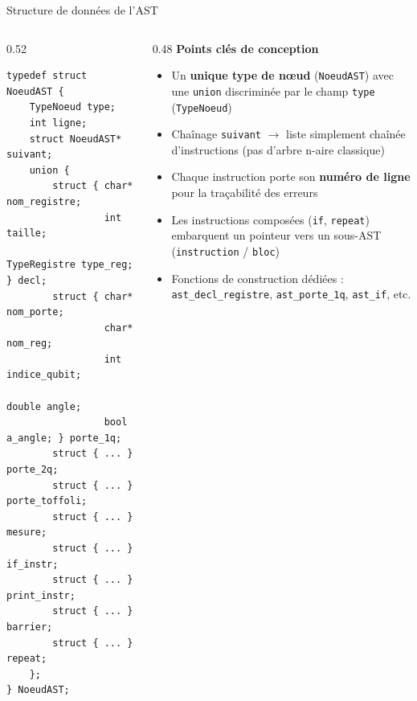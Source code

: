 \documentclass[10pt]{beamer}
\begin{document}
\begin{frame}[fragile]{Structure de données de l'AST}
  \begin{columns}[T]
    \begin{column}{0.52\textwidth}
\begin{lstlisting}[style=cstyle]
typedef struct NoeudAST {
    TypeNoeud type;
    int ligne;
    struct NoeudAST* suivant;
    union {
        struct { char* nom_registre;
                 int taille;
                 TypeRegistre type_reg; } decl;
        struct { char* nom_porte;
                 char* nom_reg;
                 int indice_qubit;
                 double angle;
                 bool a_angle; } porte_1q;
        struct { ... } porte_2q;
        struct { ... } porte_toffoli;
        struct { ... } mesure;
        struct { ... } if_instr;
        struct { ... } print_instr;
        struct { ... } barrier;
        struct { ... } repeat;
    };
} NoeudAST;
\end{lstlisting}
    \end{column}
    \begin{column}{0.48\textwidth}
      \textbf{Points clés de conception}
      \begin{itemize}
        \small
        \item Un \textbf{unique type de nœud} (\texttt{NoeudAST}) avec une \texttt{union} discriminée par le champ \texttt{type} (\texttt{TypeNoeud})
        \item Chaînage \texttt{suivant} $\to$ liste simplement chaînée d'instructions (pas d'arbre n-aire classique)
        \item Chaque instruction porte son \textbf{numéro de ligne} pour la traçabilité des erreurs
        \item Les instructions composées (\texttt{if}, \texttt{repeat}) embarquent un pointeur vers un sous-AST (\texttt{instruction} / \texttt{bloc})
        \item Fonctions de construction dédiées : \texttt{ast\_decl\_registre}, \texttt{ast\_porte\_1q}, \texttt{ast\_if}, etc.
      \end{itemize}
    \end{column}
  \end{columns}
\end{frame}
\end{document}
